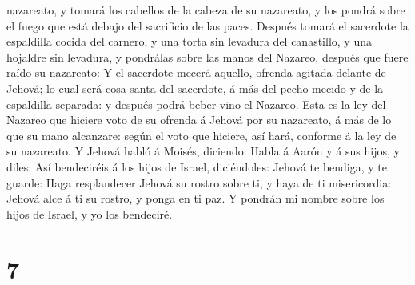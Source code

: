 nazareato, y tomará los cabellos de la cabeza de su nazareato, y los
pondrá sobre el fuego que está debajo del sacrificio de las paces.
 Después tomará el sacerdote la espaldilla cocida del
carnero, y una torta sin levadura del canastillo, y una hojaldre sin
levadura, y pondrálas sobre las manos del Nazareo, después que fuere
raído su nazareato:  Y el sacerdote mecerá aquello,
ofrenda agitada delante de Jehová; lo cual será cosa santa del
sacerdote, á más del pecho mecido y de la espaldilla separada: y después
podrá beber vino el Nazareo.  Esta es la ley del Nazareo
que hiciere voto de su ofrenda á Jehová por su nazareato, á más de lo
que su mano alcanzare: según el voto que hiciere, así hará, conforme á
la ley de su nazareato.  Y Jehová habló á Moisés,
diciendo:  Habla á Aarón y á sus hijos, y diles: Así
bendeciréis á los hijos de Israel, diciéndoles:  Jehová
te bendiga, y te guarde:  Haga resplandecer Jehová su
rostro sobre ti, y haya de ti misericordia:  Jehová alce
á ti su rostro, y ponga en ti paz.  Y pondrán mi nombre
sobre los hijos de Israel, y yo los bendeciré.

\hypertarget{section-6}{%
\section{7}\label{section-6}}

